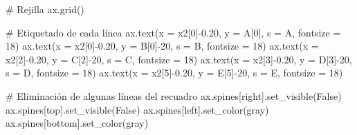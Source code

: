 \documentclass[
  letterpaper,
  DIV=11,
  numbers=noendperiod]{scrreprt}
\newenvironment{Shaded}{\begin{snugshade}}{\end{snugshade}}
\newcommand{\CommentTok}[1]{\textcolor[rgb]{0.37,0.37,0.37}{#1}}
\newcommand{\DecValTok}[1]{\textcolor[rgb]{0.68,0.00,0.00}{#1}}
\newcommand{\FloatTok}[1]{\textcolor[rgb]{0.68,0.00,0.00}{#1}}
\newcommand{\NormalTok}[1]{\textcolor[rgb]{0.00,0.23,0.31}{#1}}
\newcommand{\OperatorTok}[1]{\textcolor[rgb]{0.37,0.37,0.37}{#1}}
\newcommand{\StringTok}[1]{\textcolor[rgb]{0.13,0.47,0.30}{#1}}
\newcommand{\VariableTok}[1]{\textcolor[rgb]{0.07,0.07,0.07}{#1}}
\begin{document}
\begin{Shaded}
\begin{Highlighting}[]
\CommentTok{\# Rejilla }
\NormalTok{ax.grid()}

\CommentTok{\# Etiquetado de cada línea}
\NormalTok{ax.text(x }\OperatorTok{=}\NormalTok{ x2[}\DecValTok{0}\NormalTok{]}\OperatorTok{{-}}\FloatTok{0.20}\NormalTok{, y }\OperatorTok{=}\NormalTok{ A[}\DecValTok{0}\NormalTok{], s }\OperatorTok{=} \StringTok{\textquotesingle{}A\textquotesingle{}}\NormalTok{, fontsize }\OperatorTok{=} \DecValTok{18}\NormalTok{)}
\NormalTok{ax.text(x }\OperatorTok{=}\NormalTok{ x2[}\DecValTok{0}\NormalTok{]}\OperatorTok{{-}}\FloatTok{0.20}\NormalTok{, y }\OperatorTok{=}\NormalTok{ B[}\DecValTok{0}\NormalTok{]}\OperatorTok{{-}}\DecValTok{20}\NormalTok{, s }\OperatorTok{=} \StringTok{\textquotesingle{}B\textquotesingle{}}\NormalTok{, fontsize }\OperatorTok{=} \DecValTok{18}\NormalTok{)}
\NormalTok{ax.text(x }\OperatorTok{=}\NormalTok{ x2[}\DecValTok{2}\NormalTok{]}\OperatorTok{{-}}\FloatTok{0.20}\NormalTok{, y }\OperatorTok{=}\NormalTok{ C[}\DecValTok{2}\NormalTok{]}\OperatorTok{{-}}\DecValTok{20}\NormalTok{, s }\OperatorTok{=} \StringTok{\textquotesingle{}C\textquotesingle{}}\NormalTok{, fontsize }\OperatorTok{=} \DecValTok{18}\NormalTok{)}
\NormalTok{ax.text(x }\OperatorTok{=}\NormalTok{ x2[}\DecValTok{3}\NormalTok{]}\OperatorTok{{-}}\FloatTok{0.20}\NormalTok{, y }\OperatorTok{=}\NormalTok{ D[}\DecValTok{3}\NormalTok{]}\OperatorTok{{-}}\DecValTok{20}\NormalTok{, s }\OperatorTok{=} \StringTok{\textquotesingle{}D\textquotesingle{}}\NormalTok{, fontsize }\OperatorTok{=} \DecValTok{18}\NormalTok{)}
\NormalTok{ax.text(x }\OperatorTok{=}\NormalTok{ x2[}\DecValTok{5}\NormalTok{]}\OperatorTok{{-}}\FloatTok{0.20}\NormalTok{, y }\OperatorTok{=}\NormalTok{ E[}\DecValTok{5}\NormalTok{]}\OperatorTok{{-}}\DecValTok{20}\NormalTok{, s }\OperatorTok{=} \StringTok{\textquotesingle{}E\textquotesingle{}}\NormalTok{, fontsize }\OperatorTok{=} \DecValTok{18}\NormalTok{)}

\CommentTok{\# Eliminación de algunas líneas del recuadro}
\NormalTok{ax.spines[}\StringTok{\textquotesingle{}right\textquotesingle{}}\NormalTok{].set\_visible(}\VariableTok{False}\NormalTok{)}
\NormalTok{ax.spines[}\StringTok{\textquotesingle{}top\textquotesingle{}}\NormalTok{].set\_visible(}\VariableTok{False}\NormalTok{)}
\NormalTok{ax.spines[}\StringTok{\textquotesingle{}left\textquotesingle{}}\NormalTok{].set\_color(}\StringTok{\textquotesingle{}gray\textquotesingle{}}\NormalTok{)}
\NormalTok{ax.spines[}\StringTok{\textquotesingle{}bottom\textquotesingle{}}\NormalTok{].set\_color(}\StringTok{\textquotesingle{}gray\textquotesingle{}}\NormalTok{)}


\end{Highlighting}
\end{Shaded}
\end{document}
